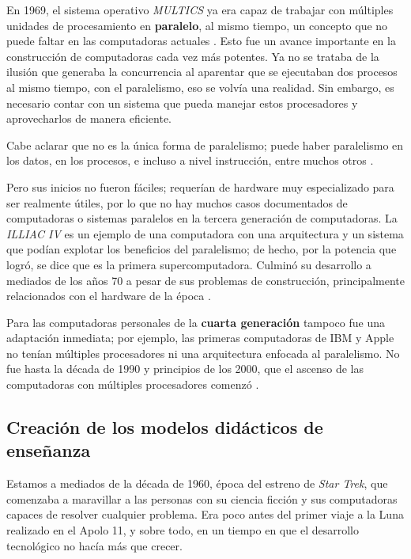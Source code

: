 \documentclass[letterpaper,12pt,oneside]{book}
\begin{document}
		En 1969, el sistema operativo \textit{MULTICS} ya era capaz de trabajar con múltiples unidades de procesamiento en \textbf{paralelo}, al mismo tiempo, un concepto que
		no puede faltar en las computadoras actuales \cite[p. 899]{silberschatz_operating_2009}. Esto fue un avance importante
		en la construcción de computadoras cada vez más potentes. Ya no se trataba de la ilusión que generaba la concurrencia
		al aparentar que se ejecutaban dos procesos al mismo tiempo, con el paralelismo, eso se volvía una realidad. Sin embargo,   
		es necesario contar con un sistema 	
		que pueda manejar estos procesadores y aprovecharlos de manera eficiente.
        
        Cabe aclarar que no es la única forma de paralelismo; puede haber paralelismo en
		los datos, en los procesos, e incluso a nivel instrucción, entre muchos otros \cite{null_essentials_2003}.
		
		Pero sus inicios no fueron fáciles; requerían de hardware muy especializado para ser realmente útiles, por lo que no hay muchos casos documentados
		de computadoras o sistemas paralelos en la tercera generación de computadoras. La \textit{ILLIAC IV} es un ejemplo de una computadora con
		una arquitectura y un sistema que podían explotar los beneficios del paralelismo; de hecho, por la potencia que logró, se dice que es la primera supercomputadora. 
		Culminó su desarrollo a mediados de los años 70 a pesar de sus problemas de construcción,
		principalmente relacionados con el hardware de la época \cite{hord_illiac_1982}.
		
		Para las computadoras personales de la \textbf{cuarta generación} tampoco fue una adaptación inmediata; por ejemplo, las primeras computadoras de IBM y Apple no tenían
		múltiples procesadores ni una arquitectura enfocada al paralelismo. No fue hasta la década de 1990 y principios de los 2000, que el ascenso de las computadoras con múltiples procesadores comenzó \cite{tanenbaum_modern_2002}.

		
		
		\clearpage		
		\subsection{Creación de los modelos didácticos de enseñanza}
		
		Estamos a mediados de la década de 1960, época del estreno de \textit{Star Trek}, que comenzaba a maravillar a las personas con su ciencia ficción  y sus
		computadoras capaces de resolver cualquier problema. Era poco antes del primer viaje a la Luna realizado en el Apolo 11, y sobre todo,
		en un tiempo en que el desarrollo tecnológico no hacía más que crecer.
  
\end{document}

